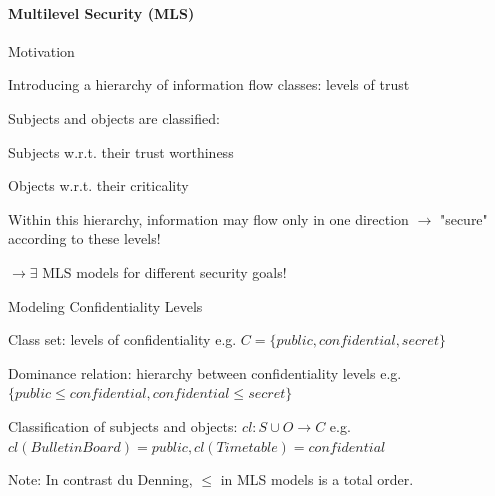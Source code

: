 \documentclass[a4paper]{article}
\begin{document}
\begin{multicols}{3}
    \paragraph{Multilevel Security (MLS)}
    Motivation
    \begin{itemize*}
        \item Introducing a hierarchy of information flow classes: levels of trust
        \item Subjects and objects are classified:
        \begin{itemize*}
            \item Subjects w.r.t. their trust worthiness
            \item Objects w.r.t. their criticality
        \end{itemize*}
        \item Within this hierarchy, information may flow only in one direction $\rightarrow$ "secure" according to these levels!
        \item $\rightarrow \exists$ MLS models for different security goals!
    \end{itemize*}

    Modeling Confidentiality Levels
    \begin{itemize*}
        \item Class set: levels of confidentiality e.g. $C=\{public,confidential,secret\}$
        \item Dominance relation: hierarchy between confidentiality levels e.g. $\{public \leq confidential,confidential \leq secret\}$
        \item Classification of subjects and objects: $cl:S\cup O\rightarrow C$ e.g. $cl(BulletinBoard)=public,cl(Timetable)=confidential$
        \item Note: In contrast du Denning, $\leq$ in MLS models is a total order.
    \end{itemize*}


\end{multicols}
\end{document}
